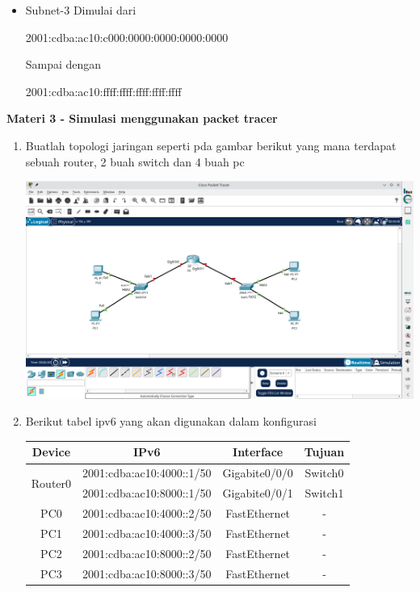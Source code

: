 \documentclass{article}
\begin{document}
\begin{flushleft}
\begin{itemize}
            \item[] Subnet-3 \newline
            Dimulai dari 
            \begin{center}
                2001:cdba:ac10:c000:0000:0000:0000:0000
            \end{center}

            Sampai dengan 
            \begin{center}
                2001:cdba:ac10:ffff:ffff:ffff:ffff:ffff
            \end{center}
        \end{itemize}
    \end{flushleft}

    \newpage
    \begin{flushleft}
        \textbf{Materi 3 - Simulasi menggunakan packet tracer}
        \newline

        \begin{enumerate}
            \item Buatlah topologi jaringan seperti pda gambar berikut yang mana terdapat sebuah router, 2 buah switch dan 4 buah pc

            \includegraphics[scale=0.3]{3-1.png}

            \item Berikut tabel ipv6 yang akan digunakan dalam konfigurasi
            \begin{tabular}{|c|c|c|c|}
                \hline
                Device & IPv6 & Interface & Tujuan \\
                \hline
                \multirow{2}{4em}{Router0 }& 2001:cdba:ac10:4000::1/50 & Gigabite0/0/0 & Switch0 \\
                & 2001:cdba:ac10:8000::1/50 & Gigabite0/0/1 & Switch1 \\
                \hline
                PC0 & 2001:cdba:ac10:4000::2/50 & FastEthernet & - \\
                PC1 & 2001:cdba:ac10:4000::3/50 & FastEthernet & - \\
                PC2 & 2001:cdba:ac10:8000::2/50 & FastEthernet & - \\
                PC3 & 2001:cdba:ac10:8000::3/50 & FastEthernet & - \\
                \hline
            \end{tabular}


\end{enumerate}
\end{flushleft}
\end{document}
